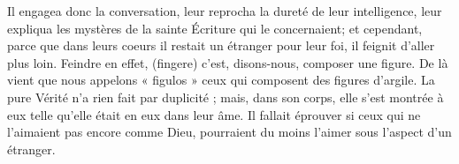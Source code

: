  Il engagea donc la conversation, leur reprocha la dureté de leur intelligence, leur expliqua les mystères de la sainte Écriture qui le concernaient; et cependant, parce que dans leurs coeurs il restait un étranger pour leur foi, il feignit d’aller plus loin. Feindre en effet, (fingere) c’est, disons-nous, composer une figure. De là vient que nous appelons « figulos » ceux qui composent des figures d’argile. La pure Vérité n’a rien fait par duplicité ; mais, dans son corps, elle s’est montrée à eux telle qu’elle était en eux dans leur âme. Il fallait éprouver si ceux qui ne l’aimaient pas encore comme Dieu, pourraient du moins l’aimer sous l’aspect d’un étranger.